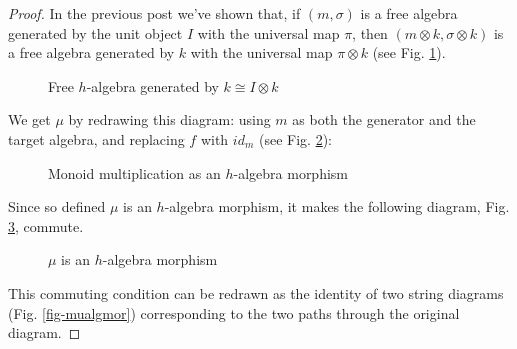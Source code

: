 \documentclass[letterpaper, 10 pt, conference]{ieeeconf}
\begin{document}
\begin{proof}
In the previous post we've shown that, if $(m, \sigma)$ is a free algebra generated by the unit object $I$  with the universal map $\pi$, then $(m \otimes k, \sigma \otimes k)$ is a free algebra generated by $k$  with the universal map $\pi \otimes k$ (see Fig. \ref{fig-freek}).
\begin{figure}[H]
\centering
{}
\caption{Free $h$-algebra generated by $k \cong I \otimes k$}
\label{fig-freek}
\end{figure}

We get $\mu$ by redrawing this diagram: using $m$ as both the generator and the target algebra, and replacing $f$ with $id_m$ (see Fig. \ref{fig-monmul}):
\begin{figure}[H]
\centering
{}
\caption{Monoid multiplication as an $h$-algebra morphism}
\label{fig-monmul}
\end{figure}

Since so defined $\mu$ is an $h$-algebra morphism, it makes the following diagram, Fig. \ref{fig-mualg}, commute.

\begin{figure}[H]
\centering
{}
\caption{$\mu$ is an $h$-algebra morphism}
\label{fig-mualg}
\end{figure}


This commuting condition can be redrawn as the identity of two string diagrams (Fig. \ref{fig-mualgmor}) corresponding to the two paths through the original diagram. 


\end{proof}
\end{document}
